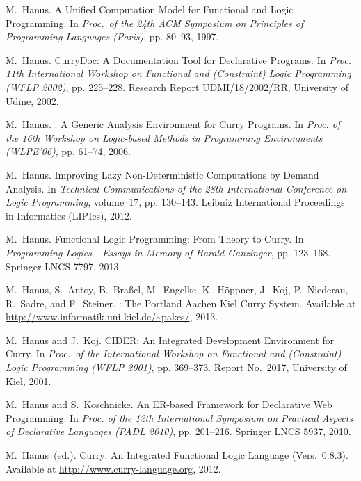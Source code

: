 \documentclass{llncs}
\begin{document}
\begin{thebibliography}{10}
M.~Hanus.
\newblock A Unified Computation Model for Functional and Logic Programming.
\newblock In {\em Proc.\ of the 24th ACM Symposium on Principles of Programming
  Languages (Paris)}, pp. 80--93, 1997.

M.~Hanus.
\newblock CurryDoc: A Documentation Tool for Declarative Programs.
\newblock In {\em Proc. 11th International Workshop on Functional and
  (Constraint) Logic Programming (WFLP 2002)}, pp. 225--228. Research Report
  UDMI/18/2002/RR, University of Udine, 2002.

M.~Hanus.
: A Generic Analysis Environment for {Curry} Programs.
\newblock In {\em Proc. of the 16th Workshop on Logic-based Methods in
  Programming Environments (WLPE'06)}, pp. 61--74, 2006.

M.~Hanus.
\newblock Improving Lazy Non-Deterministic Computations by Demand Analysis.
\newblock In {\em Technical Communications of the 28th International Conference
  on Logic Programming}, volume~17, pp. 130--143. Leibniz International
  Proceedings in Informatics (LIPIcs), 2012.

M.~Hanus.
\newblock Functional Logic Programming: From Theory to {Curry}.
\newblock In {\em Programming Logics - Essays in Memory of Harald Ganzinger},
  pp. 123--168. Springer LNCS 7797, 2013.

M.~Hanus, S.~Antoy, B.~Bra{\ss}el, M.~Engelke, K.~H{\"o}ppner, J.~Koj,
  P.~Niederau, R.~Sadre, and F.~Steiner.
: The {P}ortland {A}achen {K}iel {C}urry {S}ystem.
\newblock Available at \url{http://www.informatik.uni-kiel.de/~pakcs/}, 2013.

M.~Hanus and J.~Koj.
\newblock CIDER: An Integrated Development Environment for Curry.
\newblock In {\em Proc.\ of the International Workshop on Functional and
  (Constraint) Logic Programming (WFLP 2001)}, pp. 369--373. Report No.~2017,
  University of Kiel, 2001.

M.~Hanus and S.~Koschnicke.
\newblock An {ER-based} Framework for Declarative Web Programming.
\newblock In {\em Proc. of the 12th International Symposium on Practical
  Aspects of Declarative Languages (PADL 2010)}, pp. 201--216. Springer LNCS
  5937, 2010.

M.~Hanus~(ed.).
\newblock Curry: An Integrated Functional Logic Language (Vers.\ 0.8.3).
\newblock Available at \url{http://www.curry-language.org}, 2012.


\end{thebibliography}
\end{document}
